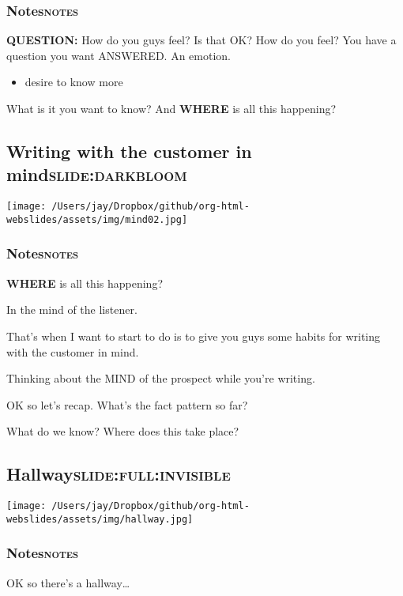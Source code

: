 \documentclass[12pt]{article}
\begin{document}
\subsubsection[Notes]{Notes\hfill{}\textsc{notes}}
\label{sec:orgd560e7f}
\textbf{QUESTION:} How do you guys feel?
Is that OK?
How do you feel?
You have a question you want ANSWERED.
An emotion.
\begin{itemize}
\item desire to know more
\end{itemize}
What is it you want to know?
And \textbf{WHERE} is all this happening?

\subsection[Writing with the customer in mind]{Writing with the customer in mind\hfill{}\textsc{slide:darkbloom}}
\label{sec:org08559bc}
\begin{center}
\texttt{[image: /Users/jay/Dropbox/github/org-html-webslides/assets/img/mind02.jpg]}
\end{center}

\subsubsection[Notes]{Notes\hfill{}\textsc{notes}}
\label{sec:orgdbd0dab}
\textbf{WHERE} is all this happening?

In the mind of the listener.

That's when I want to start to do is to give you guys some habits for writing with the customer in mind.

Thinking about the MIND of the prospect while you're writing.

OK so let's recap. What's the fact pattern so far?

What do we know? Where does this take place?
\subsection[Hallway]{Hallway\hfill{}\textsc{slide:full:invisible}}
\label{sec:org3f6bfe8}
\begin{center}
\texttt{[image: /Users/jay/Dropbox/github/org-html-webslides/assets/img/hallway.jpg]}
\end{center}

\subsubsection[Notes]{Notes\hfill{}\textsc{notes}}
\label{sec:org53b888d}
OK so there's a hallway\ldots{}
\end{document}
